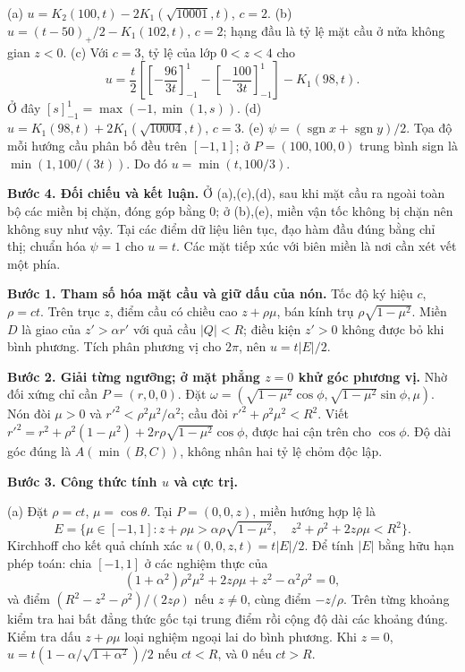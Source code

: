 (a) $u=K_2(100,t)-2K_1(\sqrt{10001},t)$, $c=2$.
(b) $u=(t-50)_+/2-K_1(102,t)$, $c=2$; hạng đầu là tỷ lệ mặt cầu ở nửa không gian $z<0$.
(c) Với $c=3$, tỷ lệ của lớp $0<z<4$ cho
\[u=\frac t2\left[\left[-\frac{96}{3t}\right]_{-1}^1-\left[-\frac{100}{3t}\right]_{-1}^1\right]-K_1(98,t).\]
Ở đây $[s]_{-1}^1=\max(-1,\min(1,s))$.
(d) $u=K_1(98,t)+2K_1(\sqrt{10004},t)$, $c=3$.
(e) $\psi=(\operatorname{sgn}x+\operatorname{sgn}y)/2$. Tọa độ mỗi hướng cầu phân bố đều trên $[-1,1]$; ở $P=(100,100,0)$ trung bình sign là $\min(1,100/(3t))$. Do đó $u=\min(t,100/3)$.

\textbf{Bước 4. Đối chiếu và kết luận.} Ở (a),(c),(d), sau khi mặt cầu ra ngoài toàn bộ các miền bị chặn, đóng góp bằng $0$; ở (b),(e), miền vận tốc không bị chặn nên không suy như vậy. Tại các điểm dữ liệu liên tục, đạo hàm đầu đúng bằng chỉ thị; chuẩn hóa $\psi=1$ cho $u=t$. Các mặt tiếp xúc với biên miền là nơi cần xét vết một phía.

\textbf{Bước 1. Tham số hóa mặt cầu và giữ dấu của nón.} Tốc độ ký hiệu $c$, $\rho=ct$. Trên trục $z$, điểm cầu có chiều cao $z+\rho\mu$, bán kính trụ $\rho\sqrt{1-\mu^2}$. Miền $D$ là giao của $z'>\alpha r'$ với quả cầu $|Q|<R$; điều kiện $z'>0$ không được bỏ khi bình phương. Tích phân phương vị cho $2\pi$, nên $u=t|E|/2$.

\textbf{Bước 2. Giải từng ngưỡng; ở mặt phẳng $z=0$ khử góc phương vị.} Nhờ đối xứng chỉ cần $P=(r,0,0)$. Đặt $\omega=(\sqrt{1-\mu^2}\cos\phi,\sqrt{1-\mu^2}\sin\phi,\mu)$. Nón đòi $\mu>0$ và $r'^2<\rho^2\mu^2/\alpha^2$; cầu đòi $r'^2+\rho^2\mu^2<R^2$. Viết $r'^2=r^2+\rho^2(1-\mu^2)+2r\rho\sqrt{1-\mu^2}\cos\phi$, được hai cận trên cho $\cos\phi$. Độ dài góc đúng là $A(\min(B,C))$, không nhân hai tỷ lệ chỏm độc lập.

\textbf{Bước 3. Công thức tính $u$ và cực trị.}

(a) Đặt $\rho=ct$, $\mu=\cos\theta$. Tại $P=(0,0,z)$, miền hướng hợp lệ là
\[E=\{\mu\in[-1,1]:z+\rho\mu>\alpha\rho\sqrt{1-\mu^2},\quad z^2+\rho^2+2z\rho\mu<R^2\}.\]
Kirchhoff cho kết quả chính xác $u(0,0,z,t)=t|E|/2$. Để tính $|E|$ bằng hữu hạn phép toán: chia $[-1,1]$ ở các nghiệm thực của
\[(1+\alpha^2)\rho^2\mu^2+2z\rho\mu+z^2-\alpha^2\rho^2=0,\]
và điểm $(R^2-z^2-\rho^2)/(2z\rho)$ nếu $z\ne0$, cùng điểm $-z/\rho$. Trên từng khoảng kiểm tra hai bất đẳng thức gốc tại trung điểm rồi cộng độ dài các khoảng đúng. Kiểm tra dấu $z+\rho\mu$ loại nghiệm ngoại lai do bình phương. Khi $z=0$, $u=t(1-\alpha/\sqrt{1+\alpha^2})/2$ nếu $ct<R$, và 0 nếu $ct>R$.

